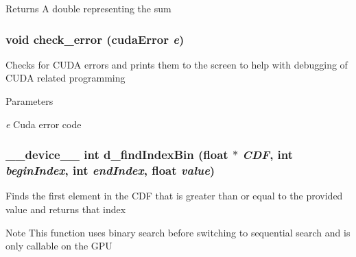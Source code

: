 \begin{DoxyReturn}{Returns}
A double representing the sum 
\end{DoxyReturn}
\hypertarget{ex__particle__CUDA__naive_8cu_a4a894e10d3ce85515e41ac09c7f052c3}{
\subsubsection[{check\_\-error}]{\setlength{\rightskip}{0pt plus 5cm}void check\_\-error (cudaError {\em e})}}
\label{ex__particle__CUDA__naive_8cu_a4a894e10d3ce85515e41ac09c7f052c3}
Checks for CUDA errors and prints them to the screen to help with debugging of CUDA related programming 
\begin{DoxyParams}{Parameters}
\item[{\em e}]Cuda error code \end{DoxyParams}
\hypertarget{ex__particle__CUDA__naive_8cu_a6ded92551e271ff186c6f08dbf3a8443}{
\subsubsection[{d\_\-findIndexBin}]{\setlength{\rightskip}{0pt plus 5cm}\_\-\_\-device\_\-\_\- int d\_\-findIndexBin (float $\ast$ {\em CDF}, \/  int {\em beginIndex}, \/  int {\em endIndex}, \/  float {\em value})}}
\label{ex__particle__CUDA__naive_8cu_a6ded92551e271ff186c6f08dbf3a8443}
Finds the first element in the CDF that is greater than or equal to the provided value and returns that index \begin{DoxyNote}{Note}
This function uses binary search before switching to sequential search and is only callable on the GPU 
\end{DoxyNote}

